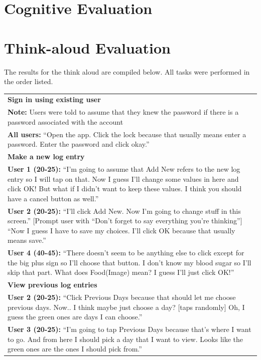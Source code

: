 \documentclass[pdftex,12pt,a4paper]{report}
\begin{document}
\section*{Cognitive Evaluation}

\section*{Think-aloud Evaluation}
The results for the think aloud are compiled below. All tasks were performed in the order listed.
\begin{center}
	\begin{tabular}{|p{\textwidth}|}
	\hline
	\textbf{Sign in using existing user}\\
	\textbf{Note:} Users were told to assume that they knew the password if there is a password associated with the account\\
	\textbf{All users:} ``Open the app. Click the lock because that usually means enter a password. Enter the password and click okay.''\\
	\hline
	\textbf{Make a new log entry}\\
	\textbf{User 1 (20-25):} ``I'm going to assume that Add New refers to the new log entry so I will tap on that. Now I guess I'll change some values in here and click OK! But what if I didn't want to keep these values. I think you should have a cancel button as well.''\\
	\textbf{User 2 (20-25):} ``I'll click Add New. Now I'm going to change stuff in this screen.'' [Prompt user with ``Don't forget to say everything you're thinking''] ``Now I guess I have to save my choices. I'll click OK because that usually means save.''\\
	\textbf{User 4 (40-45):} ``There doesn't seem to be anything else to click except for the big plus sign so I'll choose that button. I don't know my blood sugar so I'll skip that part. What does Food(Image) mean? I guess I'll just click OK!''\\
	\hline
	\textbf{View previous log entries}\\
	\textbf{User 2 (20-25):} ``Click Previous Days because that should let me choose previous days. Now.. I think maybe just choose a day? [taps randomly]  Oh, I guess the green ones are days I can choose.''\\
	\textbf{User 3 (20-25):} ``I'm going to tap Previous Days because that's where I want to go. And from here I should pick a day that I want to view. Looks like the green ones are the ones I should pick from.''\\

\end{tabular}
\end{center}
\end{document}
